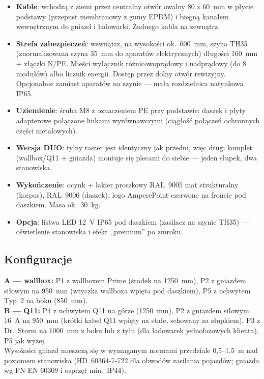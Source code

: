 \documentclass[11pt,a4paper]{article}
\begin{document}
\begin{itemize}
\item \textbf{Kable}: wchodzą z ziemi przez centralny otwór owalny $80\times60$~mm w płycie podstawy
(przepust membranowy z gumy EPDM) i biegną kanałem wewnętrznym do gniazd i ładowarki. Żadnego kabla
na zewnątrz.
\item \textbf{Strefa zabezpieczeń}: wewnątrz, na wysokości ok.~600~mm, szyna TH35 (znormalizowana
szyna 35~mm do aparatów elektrycznych) długości 160~mm + złączki N/PE. Mieści wyłącznik
różnicowoprądowy i nadprądowy (do 8 modułów) albo licznik energii. Dostęp przez dolny otwór rewizyjny.
Opcjonalnie zamiast aparatów na szynie --- mała rozdzielnica natynkowa IP65.
\item \textbf{Uziemienie}: śruba M8 z oznaczeniem PE przy podstawie; daszek i płyty adapterowe
połączone linkami wyrównawczymi (ciągłość połączeń ochronnych części metalowych).
\item \textbf{Wersja DUO}: tylny raster jest identyczny jak przedni, więc drugi komplet
(wallbox/Q11 + gniazda) montuje się plecami do siebie --- jeden słupek, dwa stanowiska.
\item \textbf{Wykończenie}: ocynk + lakier proszkowy RAL~9005 mat strukturalny (korpus), RAL~9006
(daszek), logo AmperePoint czerwone na froncie pod daszkiem. Masa ok.~30~kg.
\item \textbf{Opcja}: listwa LED 12~V IP65 pod daszkiem (zasilacz na szynie TH35) --- oświetlenie
stanowiska i efekt ,,premium'' po zmroku.
\end{itemize}

\subsection{Konfiguracje}
\textbf{A --- wallbox:} P1 z wallboxem Prime (środek na 1250~mm), P2 z gniazdem siłowym na 950~mm
(wtyczka wallboxa wpięta pod daszkiem), P5 z uchwytem Typ~2 na boku (850~mm).\\
\textbf{B --- Q11:} P4 z uchwytem Q11 na górze (1250~mm), P2 z gniazdem siłowym 16~A na 950~mm
(krótki kabel Q11 wpięty na stałe, schowany za słupkiem), P3 z Dr.~Storm na 1000~mm z boku lub
z tyłu (dla ładowarek jednofazowych klienta), P5 jak wyżej.\\
Wysokości gniazd mieszczą się w wymaganym normami przedziale 0{,}5--1{,}5~m nad poziomem stanowiska
(HD~60364-7-722 dla obwodów zasilania pojazdów; gniazda wg PN-EN 60309 i osprzęt min.~IP44).
\end{document}

